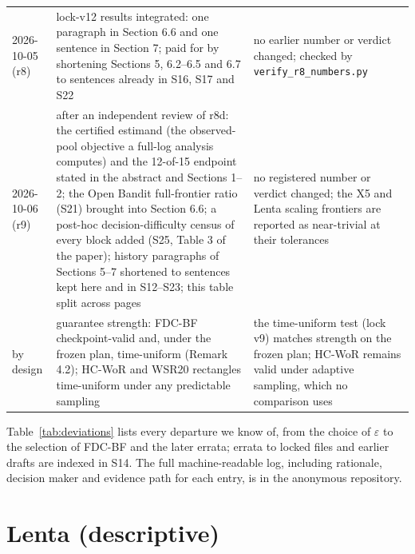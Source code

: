\documentclass[sigconf,anonymous,review]{acmart}
\newcommand{\eps}{\varepsilon}
\begin{document}
\begin{table}[p]
\begin{tabular}{@{}l>{\raggedright\arraybackslash}p{6.6cm}>{\raggedright\arraybackslash}p{7.6cm}@{}}
2026-10-05 (r8) & lock-v12 results integrated: one paragraph in Section 6.6 and one sentence in Section 7; paid for by shortening Sections 5, 6.2--6.5 and 6.7 to sentences already in S16, S17 and S22 & no earlier number or verdict changed; checked by \texttt{verify\_r8\_numbers.py} \\
2026-10-06 (r9) & after an independent review of r8d: the certified estimand (the observed-pool objective a full-log analysis computes) and the 12-of-15 endpoint stated in the abstract and Sections 1--2; the Open Bandit full-frontier ratio (S21) brought into Section 6.6; a post-hoc decision-difficulty census of every block added (S25, Table 3 of the paper); history paragraphs of Sections 5--7 shortened to sentences kept here and in S12--S23; this table split across pages & no registered number or verdict changed; the X5 and Lenta scaling frontiers are reported as near-trivial at their tolerances \\
by design & guarantee strength: FDC-BF checkpoint-valid and, under the frozen plan, time-uniform (Remark 4.2); HC-WoR and WSR20 rectangles time-uniform under any predictable sampling & the time-uniform test (lock v9) matches strength on the frozen plan; HC-WoR remains valid under adaptive sampling, which no comparison uses \\
\bottomrule
\end{tabular}
\end{table}

Table~\ref{tab:deviations} lists every departure we know of, from the choice of $\eps$ to the selection of FDC-BF and the later errata; errata to locked files and earlier drafts are indexed in S14. The full machine-readable log, including rationale, decision maker and evidence path for each entry, is in the anonymous repository.

\section{Lenta (descriptive)}\label{app:lenta}
\end{document}
